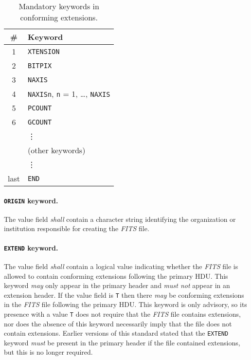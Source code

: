 \documentclass[onecolumn]{aa}
\begin{document}
\begin{table}
\centering
\caption{Mandatory keywords in conforming extensions.}
\label{t:hdr2}
\begin{tabular}{cl} 
\hline \hline
 \# & Keyword  \\
\hline
       1      & {\tt XTENSION} \\
       2      & {\tt BITPIX} \\
       3      & {\tt NAXIS} \\
       4      & {\tt NAXISn}, {\tt n} = 1, \ldots, {\tt NAXIS} \\
       5      & {\tt PCOUNT} \\
       6      & {\tt GCOUNT} \\
              & \vdots \\
              & (other keywords) \\
              & \vdots \\
       last   & {\tt END} \\
\hline
\end{tabular}
\end{table}

 \paragraph{{\tt ORIGIN} keyword.}
 The value field {\em shall} contain a character 
 string
 identifying the organization or institution responsible for
 creating the {\em FITS\/} file.
  
   \paragraph{{\tt EXTEND} keyword.}
   \label{s:ext}
 The value field {\em shall} contain a logical value indicating whether
 the {\em FITS} file is allowed to contain conforming extensions following
 the primary HDU.
 This keyword  {\em may} only appear in the primary header
 and {\em must not} appear in an extension header.  
 If the value field is {\tt T} then there {\em may} be
 conforming extensions in the {\em FITS\/} file following the primary HDU.
 This keyword is only advisory, so its presence with a value {\tt T} does not 
 require that the {\em FITS\/} file contains extensions, 
 nor does the absence of this keyword necessarily imply that the 
 file does not contain extensions.
 Earlier versions of this standard stated that the {\tt EXTEND}
 keyword {\em must} be present in the primary header if the file contained
 extensions, but this is no longer required.
\end{document}
